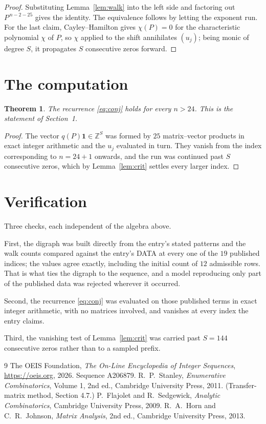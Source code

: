 \documentclass[11pt,a4paper]{article}
\theoremstyle{plain}
\newtheorem{theorem}{Theorem}
\theoremstyle{definition}
\begin{document}
\begin{proof}
Substituting Lemma~\ref{lem:walk} into the left side and factoring out
$P^{\,n-2-25}$ gives the identity. The equivalence follows by letting the exponent
run. For the last claim, Cayley--Hamilton gives $\chi(P)=0$ for the characteristic
polynomial $\chi$ of $P$, so $\chi$ applied to the shift annihilates $(u_j)$; being monic of
degree $S$, it propagates $S$ consecutive zeros forward.
\end{proof}

\section{The computation}

\begin{theorem}
The recurrence \eqref{eq:conj} holds for every $n>24$. This is the statement of
Section~1.
\end{theorem}

\begin{proof}
The vector $q(P)\mathbf{1}\in\mathbb{Z}^{S}$ was formed by $25$ matrix--vector
products in exact integer arithmetic and the $u_j$ evaluated in turn. They vanish from the
index corresponding to $n=24+1$ onwards, and the run was continued past $S$ consecutive
zeros, which by Lemma~\ref{lem:crit} settles every larger index.
\end{proof}

\section{Verification}

Three checks, each independent of the algebra above.

First, the digraph was built directly from the entry's stated patterns and the walk counts
compared against the entry's DATA at every one of the $19$ published indices; the
values agree exactly, including the initial count of $12$ admissible rows. That is
what ties the digraph to the sequence, and a model reproducing only part of the published
data was rejected wherever it occurred.

Second, the recurrence \eqref{eq:conj} was evaluated on those published terms in exact
integer arithmetic, with no matrices involved, and vanishes at every index the entry claims.

Third, the vanishing test of Lemma~\ref{lem:crit} was carried past $S=144$ consecutive
zeros rather than to a sampled prefix.

\begin{thebibliography}{9}
 The OEIS Foundation, \emph{The On-Line Encyclopedia of Integer
Sequences}, \url{https://oeis.org}, 2026. Sequence A206879.
 R.~P.~Stanley, \emph{Enumerative Combinatorics}, Volume 1, 2nd ed.,
Cambridge University Press, 2011. (Transfer-matrix method, Section 4.7.)
 P.~Flajolet and R.~Sedgewick, \emph{Analytic Combinatorics}, Cambridge
University Press, 2009.
 R.~A.~Horn and C.~R.~Johnson, \emph{Matrix Analysis}, 2nd ed., Cambridge
University Press, 2013.
\end{thebibliography}
\end{document}
